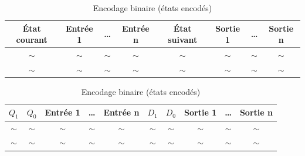 \documentclass[a4paper,11pt]{article}
\begin{document}
\begin{table}[H]
\centering
\caption{Encodage symbolique (nom des états préservé)}\label{tab1}
\renewcommand{\arraystretch}{1.2}
\begin{tabular}{c c c c c c c c}
\toprule
\textbf{État courant} & \textbf{Entrée 1} & \dots & \textbf{Entrée n} & \textbf{État suivant} & \textbf{Sortie 1} & \dots & \textbf{Sortie n} \\
\midrule
$\sim$ & $\sim$ & $\sim$ & $\sim$ & $\sim$ & $\sim$ & $\sim$ & $\sim$ \\
$\sim$ & $\sim$ & $\sim$ & $\sim$ & $\sim$ & $\sim$ & $\sim$ & $\sim$ \\
\bottomrule
\end{tabular}

\vspace{1em}

\caption{Encodage binaire (états encodés)}\label{tab2}
\renewcommand{\arraystretch}{1.2}
\begin{tabular}{c c c c c c c c c c}
\toprule
$Q_1$ & $Q_0$ & \textbf{Entrée 1} & \dots & \textbf{Entrée n} & $D_1$ & $D_0$ & \textbf{Sortie 1} & \dots & \textbf{Sortie n} \\
\midrule
$\sim$ & $\sim$ & $\sim$ & $\sim$ & $\sim$ & $\sim$ & $\sim$ & $\sim$ & $\sim$ & $\sim$ \\
$\sim$ & $\sim$ & $\sim$ & $\sim$ & $\sim$ & $\sim$ & $\sim$ & $\sim$ & $\sim$ & $\sim$ \\
\bottomrule
\end{tabular}
\end{table}
\end{document}
